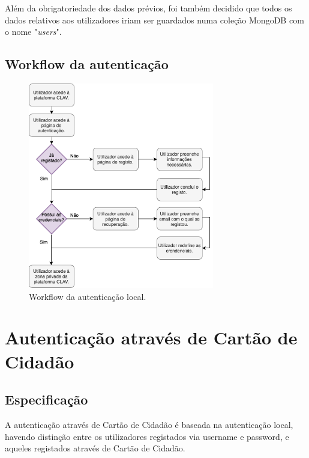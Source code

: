 Além da obrigatoriedade dos dados prévios, foi também decidido que todos os dados relativos aos utilizadores iriam ser guardados numa coleção MongoDB com o nome "\emph{users}".

\subsection{Workflow da autenticação}

\begin{figure}[h]
    \centering
    \includegraphics[width=0.725\textwidth]{img/diagramas/authlocal/AuthLocal.png}
    \caption{Workflow da autenticação local.}
    \label{fig:flow_authlocal}
\end{figure}

\cleardoublepage
\section{Autenticação através de Cartão de Cidadão}
\subsection{Especificação}

A autenticação através de Cartão de Cidadão é baseada na autenticação local, havendo distinção entre os utilizadores registados via username e password, e aqueles registados através de Cartão de Cidadão.

